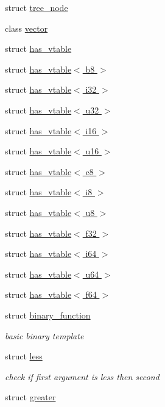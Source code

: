 \begin{DoxyCompactItemize}
\item 
struct \hyperlink{structcrap_1_1tree__node}{tree\-\_\-node}
\item 
class \hyperlink{classcrap_1_1vector}{vector}
\item 
struct \hyperlink{structcrap_1_1has__vtable}{has\-\_\-vtable}
\item 
struct \hyperlink{structcrap_1_1has__vtable_3_01b8_01_4}{has\-\_\-vtable$<$ b8 $>$}
\item 
struct \hyperlink{structcrap_1_1has__vtable_3_01i32_01_4}{has\-\_\-vtable$<$ i32 $>$}
\item 
struct \hyperlink{structcrap_1_1has__vtable_3_01u32_01_4}{has\-\_\-vtable$<$ u32 $>$}
\item 
struct \hyperlink{structcrap_1_1has__vtable_3_01i16_01_4}{has\-\_\-vtable$<$ i16 $>$}
\item 
struct \hyperlink{structcrap_1_1has__vtable_3_01u16_01_4}{has\-\_\-vtable$<$ u16 $>$}
\item 
struct \hyperlink{structcrap_1_1has__vtable_3_01c8_01_4}{has\-\_\-vtable$<$ c8 $>$}
\item 
struct \hyperlink{structcrap_1_1has__vtable_3_01i8_01_4}{has\-\_\-vtable$<$ i8 $>$}
\item 
struct \hyperlink{structcrap_1_1has__vtable_3_01u8_01_4}{has\-\_\-vtable$<$ u8 $>$}
\item 
struct \hyperlink{structcrap_1_1has__vtable_3_01f32_01_4}{has\-\_\-vtable$<$ f32 $>$}
\item 
struct \hyperlink{structcrap_1_1has__vtable_3_01i64_01_4}{has\-\_\-vtable$<$ i64 $>$}
\item 
struct \hyperlink{structcrap_1_1has__vtable_3_01u64_01_4}{has\-\_\-vtable$<$ u64 $>$}
\item 
struct \hyperlink{structcrap_1_1has__vtable_3_01f64_01_4}{has\-\_\-vtable$<$ f64 $>$}
\item 
struct \hyperlink{structcrap_1_1binary__function}{binary\-\_\-function}
\begin{DoxyCompactList}\small\item\em basic binary template \end{DoxyCompactList}\item 
struct \hyperlink{structcrap_1_1less}{less}
\begin{DoxyCompactList}\small\item\em check if first argument is less then second \end{DoxyCompactList}\item 
struct \hyperlink{structcrap_1_1greater}{greater}

\end{DoxyCompactItemize}
